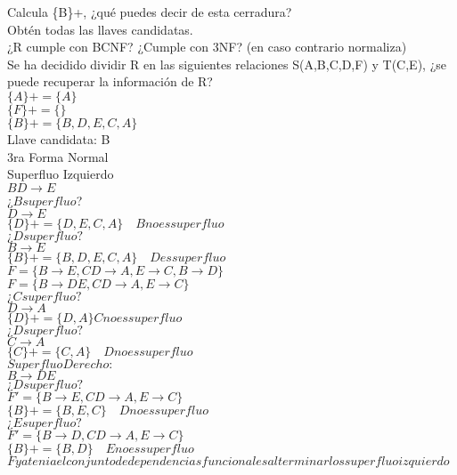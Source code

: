 \documentclass{article}
\begin{document}
\begin{enumerate}
Calcula \{B\}+, ¿qué puedes decir de esta cerradura?\\
Obtén todas las llaves candidatas.\\
¿R cumple con BCNF? ¿Cumple con 3NF? (en caso contrario normaliza)\\
Se ha decidido dividir R en las siguientes relaciones S(A,B,C,D,F) y T(C,E), ¿se puede recuperar la
información de R?\\
$\{A\}+=\{A\}$\\
$\{F\}+=\{\}$\\
$\{B\}+=\{B,D,E,C,A\}$\\
Llave candidata: B\\
3ra Forma Normal\\
Superfluo Izquierdo\\
$BD \rightarrow E$\\
¿$B superfluo$?\\
$D\rightarrow E$\\
$\{D\}+=\{D,E,C,A\} \quad B no es superfluo$\\
$¿D superfluo?$\\
$B\rightarrow E$\\
$\{B\}+=\{B,D,E,C,A\} \quad D es superfluo$\\
$F=\{B \rightarrow E, CD \rightarrow A, E \rightarrow C, B\rightarrow D\}$\\
$F=\{B \rightarrow DE, CD \rightarrow A, E \rightarrow C\}$\\
$¿C superfluo?$\\
$D\rightarrow A$\\
$\{D\}+=\{D,A\} C no es superfluo$\\
$¿D superfluo?$\\
$C \rightarrow A$\\
$\{C\}+=\{C,A\} \quad D no es superfluo$\\
$Superfluo Derecho:$\\
$B \rightarrow DE$\\
$¿D superfluo?$\\
$F'=\{B \rightarrow E, CD \rightarrow A, E\rightarrow C\}$\\
$\{B\}+=\{B,E,C\} \quad D no es superfluo$\\
$¿E superfluo?$\\
$F'=\{B \rightarrow D, CD \rightarrow A, E \rightarrow C\}$\\
$\{B\}+=\{B,D\} \quad E no es superfluo$\\
$F ya tenia el conjunto de dependencias funcionales al terminar los superfluo izquierdo$\\

\end{enumerate}
\end{document}
